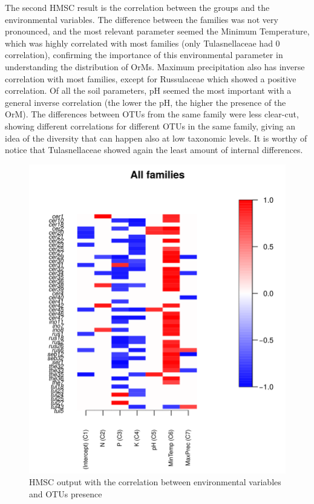The second HMSC result is the correlation between the groups and the environmental variables.
The difference between the families was not very pronounced, and the most relevant parameter seemed the Minimum Temperature, which was highly correlated with most families (only Tulasnellaceae had 0 correlation), confirming the importance of this environmental parameter in understanding the distribution of OrMs. Maximum precipitation also has inverse correlation with most families, except for Russulaceae which showed a positive correlation. Of all the soil parameters, pH seemed the most important with a general inverse correlation (the lower the pH, the higher the presence of the OrM).
The differences between OTUs from the same family were less clear-cut, showing different correlations for different OTUs in the same family, giving an idea of the diversity that can happen also at low taxonomic levels.
It is worthy of notice that Tulasnellaceae showed again the least amount of internal differences.

\begin{figure}[htbp]
\centering
\includegraphics[keepaspectratio,width=\textwidth,height=0.75\textheight]{images/envVar.png}
\caption{HMSC output with the correlation between environmental variables and OTUs presence}
\end{figure}

